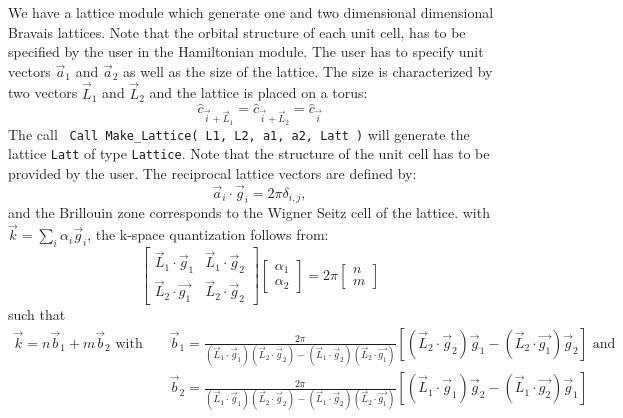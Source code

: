 We have a lattice module  which  generate   one and two dimensional dimensional Bravais lattices.   Note that the  orbital structure of each unit cell, has to be specified by the user  in the  Hamiltonian module. 
 The user has to specify unit vectors $\vec{a}_1$ and $\vec{a}_2$ as well as   the size of the  lattice. The size is  characterized by  two vectors $\vec{L}_1$ and $\vec{L}_2$   and  the lattice is placed on a torus: 
\begin{equation}
	\hat{c}_{\vec{i} + \vec{L}_1 }  = \hat{c}_{\vec{i} + \vec{L}_2 }  = \hat{c}_{\vec{i}}
\end{equation}
The call 
\texttt{ Call Make\_Lattice( L1, L2, a1,  a2, Latt )} will generate the lattice   \texttt{Latt} of type \texttt{Lattice}.   Note that  the structure of the unit cell has to be provided by the user.    The reciprocal lattice vectors are defined by: 
\begin{equation}
\label{Latt.G.eq}
	\vec{a}_i  \cdot \vec{g}_i = 2 \pi \delta_{i,j}, 
\end{equation}
and the Brillouin zone corresponds to the Wigner Seitz cell of the lattice. 
with $\vec{k} = \sum_{i} \alpha_i  \vec{g}_i $, the  k-space quantization follows from: 
\begin{equation}
\begin{bmatrix}
	\vec{L}_1 \cdot \vec{g}_1  &  \vec{L}_1 \cdot \vec{g}_2  \\
	\vec{L}_2  \cdot \vec{g_1} & \vec{L}_2 \cdot  \vec{g}_2  
\end{bmatrix}
\begin{bmatrix}
   \alpha_1 \\
   \alpha_2
\end{bmatrix}
=
2 \pi 
\begin{bmatrix}
   n \\
   m
\end{bmatrix}
\end{equation}
such that 
\begin{eqnarray}
\label{k.quant.eq}
     \vec{k} =  n \vec{b}_1  + m \vec{b}_2 \text{  with  }   & &   \vec{b}_1 = \frac{2 \pi}{ (\vec{L}_1 \cdot \vec{g}_1)  (\vec{L}_2 \cdot  \vec{g}_2 )  - (\vec{L}_1 \cdot \vec{g}_2) (\vec{L}_2  \cdot \vec{g_1} ) }   \left[  (\vec{L}_2 \cdot  \vec{g}_2) \vec{g}_1 -   (\vec{L}_2  \cdot \vec{g_1} ) \vec{g}_2 \right] \text{   and  } \nonumber \\ 
        & & \vec{b}_2 = \frac{2 \pi}{ (\vec{L}_1 \cdot \vec{g}_1)  (\vec{L}_2 \cdot  \vec{g}_2 )  - (\vec{L}_1 \cdot \vec{g}_2) (\vec{L}_2  \cdot \vec{g_1} ) }   
           \left[  (\vec{L}_1 \cdot  \vec{g}_1) \vec{g}_2 -   (\vec{L}_1  \cdot \vec{g_2} ) \vec{g}_1 \right] 
\end{eqnarray}
